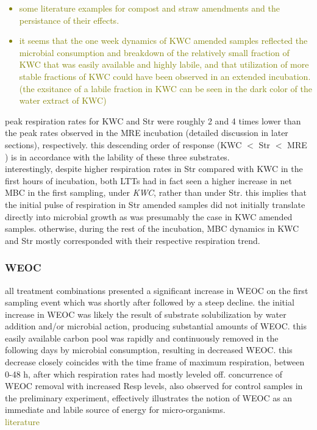 \documentclass[12pt]{report}
\newcommand{\myGreen}[1]{\textcolor{olive}{#1}} %
\begin{document}
			\myGreen{\begin{itemize}
					\item some literature examples for compost and straw amendments and the persistance of their effects.
					\item it seems that the one week dynamics of KWC amended samples reflected the microbial consumption and breakdown of the relatively small fraction of KWC that was easily available and highly labile, and that utilization of more stable fractions of KWC could have been observed in an extended incubation. (the exsitance of a labile fraction in KWC can be seen in the dark color of the water extract of KWC)
				\end{itemize}}
			peak respiration rates for KWC and Str were roughly 2 and 4 times lower than the peak rates observed in the MRE incubation (detailed discussion in later sections), respectively. this descending order of response (KWC $ < $ Str $ < $ MRE ) is in accordance with the lability of these three substrates.\\
			interestingly, despite higher respiration rates in Str compared with KWC in the first hours of incubation, both LTTs had in fact seen a higher increase in net MBC in the first sampling, under \emph{KWC}, rather than under Str. this implies that the initial pulse of respiration in Str amended samples did not initially translate directly into microbial growth as was presumably the case in KWC amended samples. otherwise, during the rest of the incubation, MBC dynamics in KWC and Str mostly corresponded with their respective respiration trend. 
			
		\subsubsection{WEOC}
			
			all treatment combinations presented a significant increase in WEOC on the first sampling event which was shortly after followed by a steep decline. the initial increase in WEOC was likely the result of substrate solubilization by water addition and/or microbial action, producing substantial amounts of WEOC. this easily available carbon pool was rapidly and continuously removed in the following days by microbial consumption, resulting in decreased WEOC. this decrease closely coincides with the time frame of maximum respiration, between 0-48 h, after which respiration rates had mostly leveled off. concurrence of WEOC removal with increased Resp levels, also observed for control samples in the preliminary experiment, effectively illustrates the  notion of WEOC as an immediate and labile source of energy for micro-organisms.\\
			\myGreen{literature}\\
			
\end{document}
